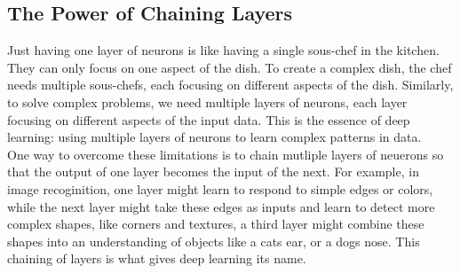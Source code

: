 \documentclass[9pt]{extarticle}
\theoremstyle{plain}
\theoremstyle{definition}
\theoremstyle{remark}
\begin{document}
\subsection{The Power of Chaining Layers}
Just having one layer of neurons is like having a single sous-chef in the kitchen. They can only focus on one aspect of the dish. To create a complex dish, the chef needs multiple sous-chefs, each focusing on different aspects of the dish. Similarly, to solve complex problems, we need multiple layers of neurons, each layer focusing on different aspects of the input data. This is the essence of deep learning: using multiple layers of neurons to learn complex patterns in data.\\[2ex]
One way to overcome these limitations is to chain mutliple layers of neuerons so that the output of one layer becomes the input of the next. For example, in image recoginition, one layer might learn to respond to simple edges or colors, while the next layer might take these edges as inputs and learn to detect more complex shapes, like corners and textures, a third layer might combine these shapes into an understanding of objects like a cats ear, or a dogs nose. This chaining of layers is what gives deep learning its name.
\end{document}
